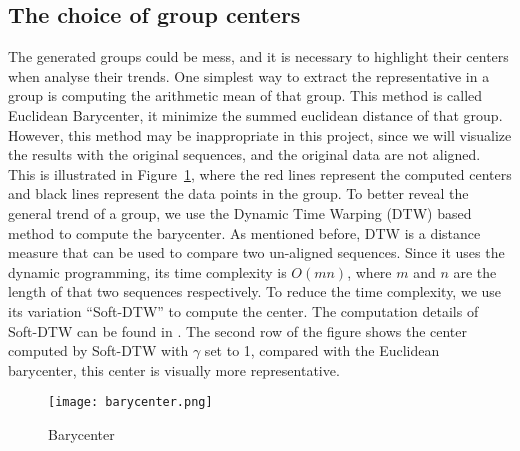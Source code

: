 \subsection{The choice of group centers}
The generated groups could be mess, and it is necessary to highlight their centers when analyse their trends. One simplest way to extract the representative in a group is computing the arithmetic mean of that group. This method is called Euclidean Barycenter, it minimize the summed euclidean distance of that group. However, this method may be inappropriate in this project, since we will visualize the results with the original sequences, and the original data are not aligned. This is illustrated in Figure~\ref{fig:barycenter1}, where the red lines represent the computed centers and black lines represent the data points in the group. To better reveal the general trend of a group, we use the Dynamic Time Warping (DTW) based method to compute the barycenter. As mentioned before, DTW is a distance measure that can be used to compare two un-aligned sequences. Since it uses the dynamic programming, its time complexity is $O(mn)$, where $m$ and $n$ are the length of that two sequences respectively. To reduce the time complexity, we use its variation ``Soft-DTW'' to compute the center. The computation details of Soft-DTW can be found in \cite{schultz2018nonsmooth}. The second row of the figure shows the center computed by Soft-DTW with $\gamma$ set to 1, compared with the Euclidean barycenter, this center is visually more representative. 
\begin{figure}[!htbp]
    \centering
    \texttt{[image: barycenter.png]}
    \caption{Barycenter}
    \label{fig:barycenter1}
\end{figure} 


